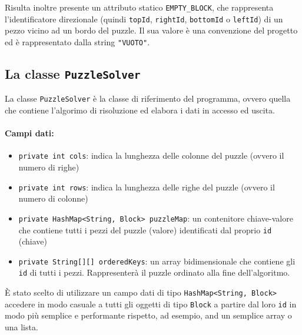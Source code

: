 Risulta inoltre presente un attributo statico \texttt{EMPTY\_BLOCK}, che rappresenta l'identificatore direzionale (quindi \texttt{topId}, \texttt{rightId}, \texttt{bottomId} o \texttt{leftId}) di un pezzo vicino ad un bordo del puzzle. Il sua valore è una convenzione del progetto ed è rappresentato dalla string \texttt{"VUOTO"}.

\subsection{La classe \texttt{PuzzleSolver}}
La classe \texttt{PuzzleSolver} è la classe di riferimento del programma, ovvero quella che contiene l'algorimo di risoluzione ed elabora i dati in accesso ed uscita. 

\paragraph{Campi dati:}
\begin{itemize}
\item \texttt{private int cols}: indica la lunghezza delle colonne del puzzle (ovvero il numero di righe)
\item \texttt{private int rows}: indica la lunghezza delle righe del puzzle (ovvero il numero di colonne)
\item \texttt{private HashMap<String, Block> puzzleMap}: un contenitore chiave-valore che contiene tutti i pezzi del puzzle (valore) identificati dal proprio \texttt{id} (chiave)
\item \texttt{private String[][] orderedKeys}: un array bidimensionale che contiene gli \texttt{id} di tutti i pezzi. Rappresenterà il puzzle ordinato alla fine dell'algoritmo.
\end{itemize} 

\`{E} stato scelto di utilizzare un campo dati di tipo \texttt{HashMap<String, Block>} accedere in modo casuale a tutti gli oggetti di tipo \texttt{Block} a partire dal loro \texttt{id} in modo più semplice e performante rispetto, ad esempio, and un semplice array o una lista.


